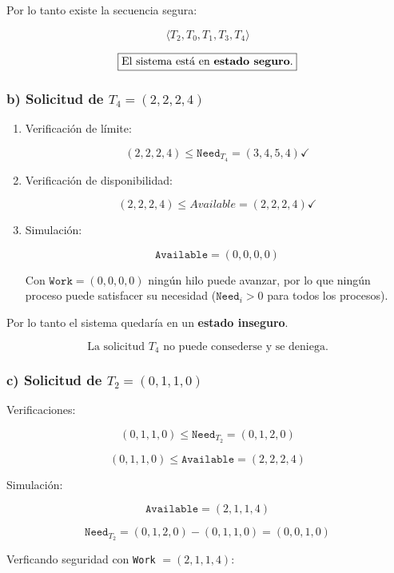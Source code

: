 \documentclass[12pt,letterpaper]{article}
\begin{document}
Por lo tanto existe la secuencia segura:

\[
\langle T_2, T_0, T_1, T_3, T_4 \rangle
\]

\[
\boxed{\text{El sistema está en \textbf{estado seguro}.}}
\]

\subsubsection*{b) Solicitud de $T_4 = (2,2,2,4)$}

\begin{enumerate}[label=\arabic*.]
\item  Verificación de límite:
  
  \[
  (2,2,2,4) \leq \texttt{Need}_{T_4} = (3,4,5,4) \checkmark
  \]

\item Verificación de disponibilidad:

  \[
  (2,2,2,4) \leq {Available} = (2,2,2,4) \checkmark
  \]

\item Simulación:
  
  \[
  \texttt{Available} = (0,0,0,0)
  \]
  
  Con $\texttt{Work} = (0,0,0,0)$ ningún hilo puede avanzar, por lo que ningún proceso puede satisfacer su necesidad ($\texttt{Need}_i > 0$ para todos los procesos).
\end{enumerate}
  
  Por lo tanto el sistema quedaría en un \textbf{estado inseguro}.
  
  \[
  \boxed{\text{La solicitud $T_4$ no puede consederse y se deniega.}}
  \]

\subsubsection*{c) Solicitud de $T_2 = (0,1,1,0)$}

Verificaciones:

\[
(0,1,1,0) \leq \texttt{Need}_{T_2} = (0,1,2,0)
\]

\[
(0,1,1,0) \leq \texttt{Available} = (2,2,2,4)
\]

Simulación:

\[
\texttt{Available} = (2,1,1,4)
\]

\[
\texttt{Need}_{T_2} = (0,1,2,0) - (0,1,1,0) = (0,0,1,0)
\]

Verficando seguridad con \texttt{Work} $= (2,1,1,4)$:
\end{document}
